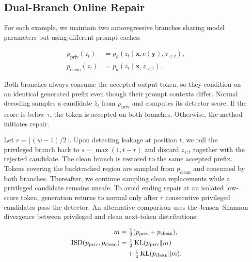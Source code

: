 \documentclass[11pt]{article}
\newcommand{\bx}{\mathbf{x}}
\newcommand{\by}{\mathbf{y}}
\begin{document}

\subsection{Dual-Branch Online Repair}
\label{sec:repair}

For each example, we maintain two autoregressive branches sharing model
parameters but using different prompt caches:

\begin{align}
p_{\mathrm{priv}}(z_t) &=
  p_\theta(z_t\mid \bx,c(\by),z_{<t}),\\
p_{\mathrm{clean}}(z_t) &=
  p_\theta(z_t\mid \bx,z_{<t}).
\end{align}

Both branches always consume the accepted output token, so they condition on an
identical generated prefix even though their prompt contexts differ.  Normal
decoding samples a candidate $\hat z_t$ from $p_{\mathrm{priv}}$ and computes its
detector score.  If the score is below $\tau$, the token is accepted on both
branches.  Otherwise, the method initiates repair.

Let $r=\lfloor(w-1)/2\rfloor$.  Upon detecting leakage at position $t$, we roll
the privileged branch back to $s=\max(1,t-r)$ and discard $z_{s:t}$ together
with the rejected candidate.  The clean branch is restored to the same accepted
prefix.  Tokens covering the backtracked region are sampled from
$p_{\mathrm{clean}}$ and consumed by both branches.  Thereafter, we continue
sampling clean replacements while a privileged candidate remains unsafe.  To
avoid ending repair at an isolated low-score token, generation returns to normal
only after $r$ consecutive privileged candidates pass the detector.  An
alternative comparison uses the Jensen--Shannon divergence between privileged
and clean next-token distributions:

\begin{align}
 m &= \tfrac12(p_{\mathrm{priv}}+p_{\mathrm{clean}}),\\
 \operatorname{JSD}(p_{\mathrm{priv}},p_{\mathrm{clean}})
 &= \tfrac12\operatorname{KL}(p_{\mathrm{priv}}\Vert m) \notag\\
 &\quad +\tfrac12\operatorname{KL}(p_{\mathrm{clean}}\Vert m).
\end{align}
\end{document}
